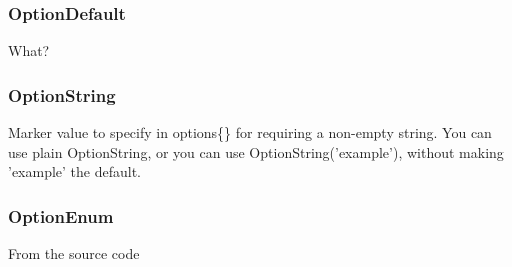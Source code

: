 \subsubsection{OptionDefault}
What?


\subsubsection{OptionString}
Marker value to specify in options\{\} for requiring a non-empty string.
You can use plain OptionString, or you can use
OptionString('example'), without making 'example' the default.
    

\subsubsection{OptionEnum}
From the source code


